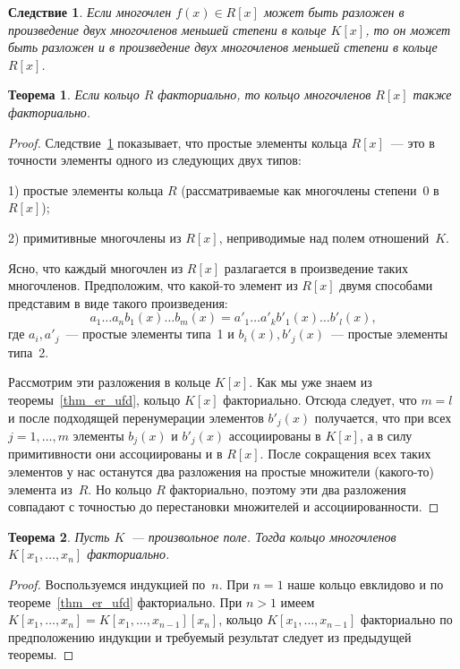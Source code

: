 \documentclass[a4paper,10pt]{amsart}
\newtheorem{theorem}{Теорема}
\newtheorem{corollary}{Следствие}
\theoremstyle{definition}
\theoremstyle{remark}
\begin{document}
\begin{corollary} \label{cc}
Если многочлен $f(x)\in R[x]$ может быть разложен в произведение
двух многочленов меньшей степени в кольце $K[x]$, то он может быть
разложен и в произведение двух многочленов меньшей степени в кольце
$R[x]$.
\end{corollary}

\begin{theorem}
Если кольцо $R$ факториально, то кольцо многочленов $R[x]$ также
факториально.
\end{theorem}

\begin{proof}
Следствие~\ref{cc} показывает, что простые элементы кольца
$R[x]$~--- это в точности элементы одного из следующих двух типов:

1) простые элементы кольца $R$ (рассматриваемые как многочлены
степени~$0$ в $R[x]$);

2) примитивные многочлены из $R[x]$, неприводимые над полем
отношений~$K$.

Ясно, что каждый многочлен из $R[x]$ разлагается в произведение
таких многочленов. Предположим, что какой-то элемент из $R[x]$ двумя
способами представим в виде такого произведения:
$$
a_1 \ldots a_n b_1(x) \ldots b_m(x) = a'_1 \ldots a'_k b'_1(x)
\ldots b'_l(x),
$$
где $a_i, a'_j$~--- простые элементы типа~1 и $b_i(x), b'_j(x)$~---
простые элементы типа~2.

Рассмотрим эти разложения в кольце $K[x]$. Как мы уже знаем из
теоремы~\ref{thm_er_ufd}, кольцо $K[x]$ факториально. Отсюда
следует, что $m = l$ и после подходящей перенумерации элементов
$b'_j(x)$ получается, что при всех $j = 1, \ldots, m$ элементы
$b_j(x)$ и $b'_j(x)$ ассоциированы в $K[x]$, а в силу примитивности
они ассоциированы и в $R[x]$. После сокращения всех таких элементов
у нас останутся два разложения на простые множители (какого-то)
элемента из~$R$. Но кольцо $R$ факториально, поэтому эти два
разложения совпадают с точностью до перестановки множителей и
ассоциированности.
\end{proof}

\begin{theorem}
Пусть $K$~--- произвольное поле. Тогда кольцо многочленов
$K[x_1,\ldots,x_n]$ факториально.
\end{theorem}

\begin{proof}
Воспользуемся индукцией по~$n$. При $n=1$ наше кольцо евклидово и по
теореме~\ref{thm_er_ufd} факториально. При $n > 1$ имеем $K[x_1,
\ldots, x_n] = K[x_1, \ldots, x_{n-1}][x_n]$, кольцо $K[x_1, \ldots,
x_{n-1}]$ факториально по предположению индукции и требуемый
результат следует из предыдущей теоремы.
\end{proof}
\end{document}
